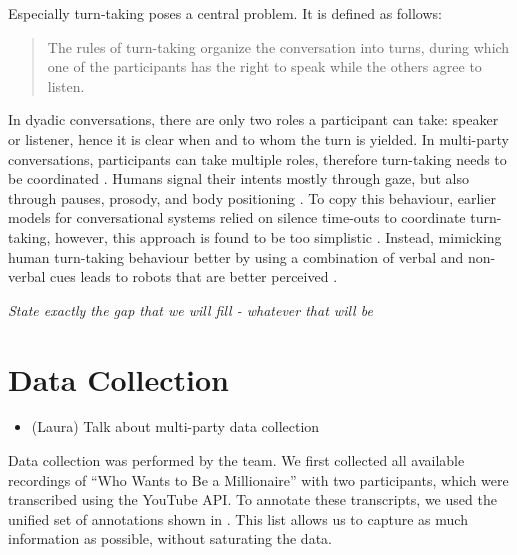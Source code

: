 \documentclass[hidelinks, 11pt]{article}
\begin{document}
Especially turn-taking poses a central problem. It is defined as follows:

\begin{quote}
  The rules of turn-taking organize the conversation into turns, during which one of the participants has the right to speak while the others agree to listen. \cite{Żarkowski_2019}
\end{quote}

In dyadic conversations, there are only two roles a participant can take: speaker or listener, hence it is clear when and to whom the turn is yielded. In multi-party conversations, participants can take multiple roles, therefore turn-taking needs to be coordinated \cite{Johansson_Skantze_2015}. Humans signal their intents mostly through gaze, but also through pauses, prosody, and body positioning \cite{Żarkowski_2019}. To copy this behaviour, earlier models for conversational systems relied on silence time-outs to coordinate turn-taking, however, this approach is found to be too simplistic \cite{skantze_turn_taking_2021}. Instead, mimicking human turn-taking behaviour better by using a combination of verbal and non-verbal cues leads to robots that are better perceived \cite{moujahid_multi_party_2022}.

\textit{State exactly the gap that we will fill - whatever that will be}


\section{Data Collection}
\label{sec:data_collection}

\begin{itemize}
  \item (Laura) Talk about multi-party data collection
\end{itemize}

Data collection was performed by the team. We first collected all available recordings of ``Who Wants to Be a Millionaire'' with two participants, which were transcribed using the YouTube API. To annotate these transcripts, we used the unified set of annotations shown in . This list allows us to capture as much information as possible, without saturating the data.
\end{document}
